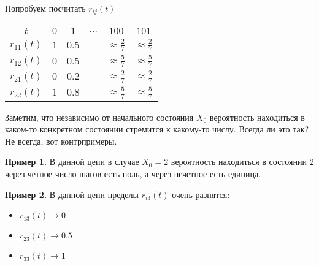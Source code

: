 \documentclass[12pt]{article}
\begin{document}
Попробуем посчитать $r_{ij}(t)$

\begin{center}
  \begin{tabular}{c|c|c|c|c|c|}
    $t$ & $0$ & $1$ & $\dots$ & $100$ & $101$ \\ \hline
    $r_{11}(t)$ & $1$ & $0.5$ & & $\approx \frac{2}{7}$ & $\approx \frac{2}{7}$ \\ \hline
    $r_{12}(t)$ & $0$ & $0.5$ & & $\approx \frac{5}{7}$ & $\approx \frac{5}{7}$ \\ \hline
    $r_{21}(t)$ & $0$ & $0.2$ & & $\approx \frac{2}{7}$ & $\approx \frac{2}{7}$ \\ \hline
    $r_{22}(t)$ & $1$ & $0.8$ & & $\approx \frac{5}{7}$ & $\approx \frac{5}{7}$ \\ \hline
  \end{tabular}
\end{center}

Заметим, что независимо от начального состояния $X_0$ вероятность находиться в каком-то конкретном состоянии стремится к какому-то числу. Всегда ли это так? Не всегда, вот контрпримеры.

\textbf{Пример 1.} В данной цепи в случае $X_0 = 2$ вероятность находиться в состоянии $2$ через четное число шагов есть ноль, а через нечетное есть единица.
\begin{center}
\end{center}

\textbf{Пример 2.} В данной цепи пределы $r_{i3}(t)$ очень разнятся:
\begin{itemize}
  \item $r_{13}(t) \to 0$
  \item $r_{23}(t) \to 0.5$
  \item $r_{33}(t) \to 1$
\end{itemize}
\end{document}
